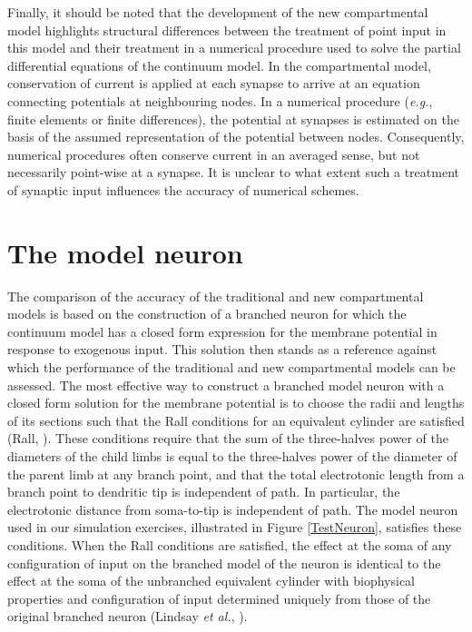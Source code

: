 Finally, it should be noted that the development of the new
compartmental model highlights structural differences between the
treatment of point input in this model and their treatment in a
numerical procedure used to solve the partial differential
equations of the continuum model. In the compartmental model,
conservation of current is applied at each synapse to arrive at an
equation connecting potentials at neighbouring nodes. In a
numerical procedure (\emph{e.g.}, finite elements or finite
differences), the potential at synapses is estimated on the basis
of the assumed representation of the potential between nodes.
Consequently, numerical procedures often conserve current in an
averaged sense, but not necessarily point-wise at a synapse. It is
unclear to what extent such a treatment of synaptic input
influences the accuracy of numerical schemes.

\section{The model neuron}
The comparison of the accuracy of the traditional and new
compartmental models is based on the construction of a branched
neuron for which the continuum model has a closed form expression
for the membrane potential in response to exogenous input. This
solution then stands as a reference against which the performance
of the traditional and new compartmental models can be assessed.
The most effective way to construct a branched model neuron with a
closed form solution for the membrane potential is to choose the
radii and lengths of its sections such that the Rall conditions
for an equivalent cylinder are satisfied (Rall, \cite{Rall64}).
These conditions require that the sum of the three-halves power of
the diameters of the child limbs is equal to the three-halves
power of the diameter of the parent limb at any branch point, and
that the total electrotonic length from a branch point to
dendritic tip is independent of path. In particular, the
electrotonic distance from soma-to-tip is independent of path. The
model neuron used in our simulation exercises, illustrated in
Figure \ref{TestNeuron}, satisfies these conditions. When the Rall
conditions are satisfied, the effect at the soma of any
configuration of input on the branched model of the neuron is
identical to the effect at the soma of the unbranched equivalent
cylinder with biophysical properties and configuration of input
determined uniquely from those of the original branched neuron
(Lindsay \emph{et al.}, \cite{Lindsay03}).


